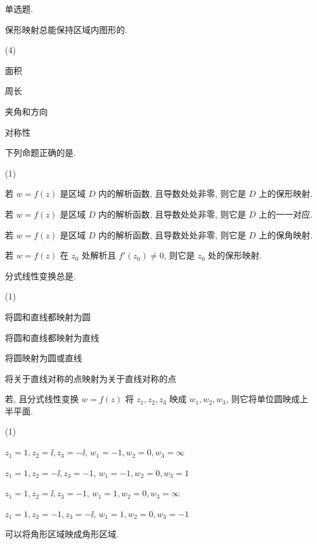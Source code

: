 \begin{homework}
  \item 单选题.
  \begin{subex}
    \item 保形映射总能保持区域内图形的\fillbrace{}.
    \begin{exchoice}(4)
      \item 面积
      \item 周长
      \item 夹角和方向
      \item 对称性
    \end{exchoice}
    \item 下列命题正确的是\fillbrace{}.
    \begin{exchoice}(1)
      \item 若 $w=f(z)$ 是区域 $D$ 内的解析函数, 且导数处处非零, 则它是 $D$ 上的保形映射.
      \item 若 $w=f(z)$ 是区域 $D$ 内的解析函数, 且导数处处非零, 则它是 $D$ 上的一一对应.
      \item 若 $w=f(z)$ 是区域 $D$ 内的解析函数, 且导数处处非零, 则它是 $D$ 上的保角映射.
      \item 若 $w=f(z)$ 在 $z_0$ 处解析且 $f'(z_0)\neq0$, 则它是 $z_0$ 处的保形映射.
    \end{exchoice}
    \item 分式线性变换总是\fillbrace{}.
    \begin{exchoice}(1)
      \item 将圆和直线都映射为圆
      \item 将圆和直线都映射为直线
      \item 将圆映射为圆或直线
      \item 将关于直线对称的点映射为关于直线对称的点
    \end{exchoice}
    \item 若\fillbrace{}, 且分式线性变换 $w=f(z)$ 将 $z_1,z_2,z_3$ 映成 $w_1,w_2,w_3$, 则它将单位圆映成上半平面.
    \begin{exchoice}(1)
      \item $z_1=1,z_2=\ii,z_3=-\ii$, $w_1=-1,w_2=0,w_3=\infty$
      \item $z_1=1,z_2=-\ii,z_3=-1$, $w_1=-1,w_2=0,w_3=1$
      \item $z_1=1,z_2=\ii,z_3=-1$, $w_1=1,w_2=0,w_3=\infty$
      \item $z_1=1,z_2=-1,z_3=-\ii$, $w_1=1,w_2=0,w_3=-1$
    \end{exchoice}
    \item \fillbrace{}可以将角形区域映成角形区域.

\end{subex}
\end{homework}
